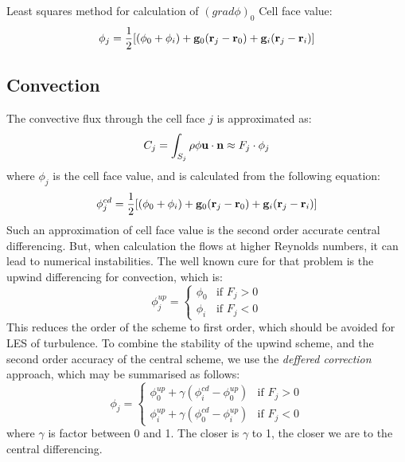 \documentclass[10pt]{article}
\begin{document}
    Least squares method for calculation of $ (grad \phi)_0 $  
    Cell face value:
    \begin{equation}
    \phi_j = \frac{1}{2} [ (\phi_0 + \phi_i) 
           +   {\bf g}_0 ({\bf r}_j - {\bf r}_0) +
               {\bf g}_i ({\bf r}_j - {\bf r}_i) ]
    \label{cellface}
    \end{equation}

    \subsection{Convection}

    The convective flux through the cell face $j$ is approximated
    as:
    \begin{equation}
      C_j = \int_{S_j} \rho \phi {\bf u} \cdot {\bf n} \approx
         F_j \cdot \phi_j   
    \end{equation}
    where $\phi_j$ is the cell face value, and is calculated
    from the following equation: 
    \begin{equation}
    \phi_j^{cd} = \frac{1}{2} [ (\phi_0 + \phi_i) 
               +   {\bf g}_0 ({\bf r}_j - {\bf r}_0) +
                   {\bf g}_i ({\bf r}_j - {\bf r}_i) ]
    \label{cellfaceCD}
    \end{equation}
    Such an approximation of cell face
    value is the second order accurate central differencing.
    But, when calculation the flows at higher Reynolds numbers,
    it can lead to numerical instabilities. The well known
    cure for that problem is the upwind differencing for 
    convection, which is: 
    \begin{equation}
    \phi_j^{up} = \left\{
                  \begin{array}{ll}
                  \phi_0 & \mbox{if $F_j > 0$} \\
                  \phi_i & \mbox{if $F_j < 0$}
                  \end{array}
                  \right. 
    \end{equation}
    This reduces the order of the scheme to first order, which 
    should be avoided for LES of turbulence. To combine the
    stability of the upwind scheme, and the second order accuracy
    of the central scheme, we use the {\em deffered correction}
    approach, which may be summarised as follows:
    \begin{equation}
    \phi_j = \left\{
             \begin{array}{ll}
             \phi_0^{up} + \gamma (\phi_i^{cd}-\phi_0^{up}) & \mbox{if $F_j > 0$} \\
             \phi_i^{up} + \gamma (\phi_0^{cd}-\phi_i^{up}) & \mbox{if $F_j < 0$}
             \end{array}
             \right. 
    \end{equation}
    where $\gamma$ is factor between 0 and 1. The closer is
    $\gamma$ to 1, the closer we are to the central differencing.
\end{document}
